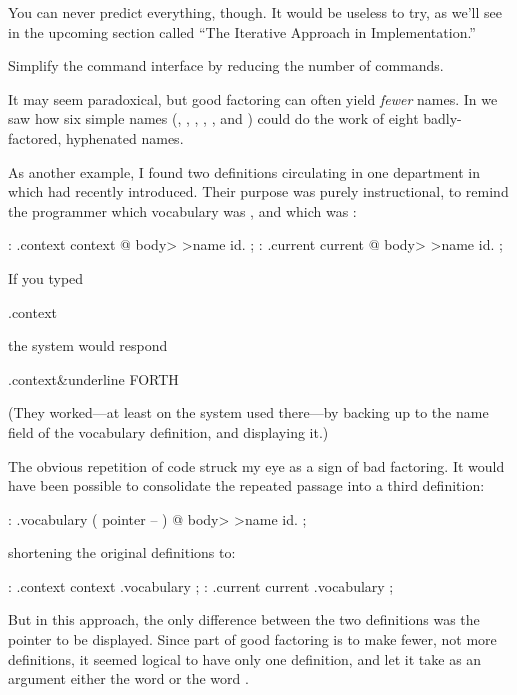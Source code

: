 You can never predict everything, though. It would be useless to try,
as we'll see in the upcoming section called ``The Iterative Approach
in Implementation.''

\begin{tip}
Simplify the command interface by reducing the number of commands.
\end{tip}
%
%
It may seem paradoxical, but good factoring can often yield
\emph{fewer} names. In  we saw how six simple names
(, , , ,
, and ) could do the work of eight
badly-factored, hyphenated names.

As another example, I found two definitions circulating in one
department in which \Forth{} had recently introduced. Their purpose
was purely instructional, to remind the programmer which vocabulary
was , and which was :

\begin{Code}
: .context   context @  body>  >name  id.  ;
: .current   current @  body>  >name  id.  ;
\end{Code}
\goodbreak
\noindent If you typed

\begin{Code}
.context
\end{Code}
the system would respond

\begin{Code}[commandchars=\&\{\}]
.context&underline{ FORTH}
\end{Code}
(They worked---at least on the system used there---by backing up to the
name field of the vocabulary definition, and displaying it.)

The obvious repetition of code struck my eye as a sign of bad
factoring. It would have been possible to consolidate the repeated
passage into a third definition:

\begin{Code}
: .vocabulary   ( pointer -- )  @  body>  >name  id. ;
\end{Code}
shortening the original definitions to:

\begin{Code}
: .context   context .vocabulary ;
: .current   current .vocabulary ;
\end{Code}
But in this approach, the only difference between the two definitions
was the pointer to be displayed. Since part of good factoring is to
make fewer, not more definitions, it seemed logical to have only one
definition, and let it take as an argument either the word
 or the word .

